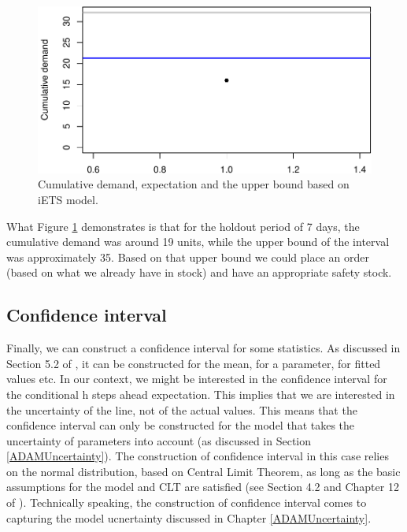 \documentclass[
]{book}
\theoremstyle{definition}
\theoremstyle{definition}
\theoremstyle{definition}
\theoremstyle{definition}
\theoremstyle{remark}
\begin{document}
\begin{figure}
\centering
\includegraphics{adam_files/figure-latex/adamModeliETSCumulative-1.pdf}
\caption{\label{fig:adamModeliETSCumulative}Cumulative demand, expectation and the upper bound based on iETS model.}
\end{figure}

What Figure \ref{fig:adamModeliETSCumulative} demonstrates is that for the holdout period of 7 days, the cumulative demand was around 19 units, while the upper bound of the interval was approximately 35. Based on that upper bound we could place an order (based on what we already have in stock) and have an appropriate safety stock.

\hypertarget{confidence-interval}{%
\subsection{Confidence interval}\label{confidence-interval}}

Finally, we can construct a confidence interval for some statistics. As discussed in Section 5.2 of \citet{SvetunkovSBA}, it can be constructed for the mean, for a parameter, for fitted values etc. In our context, we might be interested in the confidence interval for the conditional h steps ahead expectation. This implies that we are interested in the uncertainty of the line, not of the actual values. This means that the confidence interval can only be constructed for the model that takes the uncertainty of parameters into account (as discussed in Section \ref{ADAMUncertainty}). The construction of confidence interval in this case relies on the normal distribution, based on Central Limit Theorem, as long as the basic assumptions for the model and CLT are satisfied (see Section 4.2 and Chapter 12 of \citet{SvetunkovSBA}). Technically speaking, the construction of confidence interval comes to capturing the model ucnertainty discussed in Chapter \ref{ADAMUncertainty}.
\end{document}
